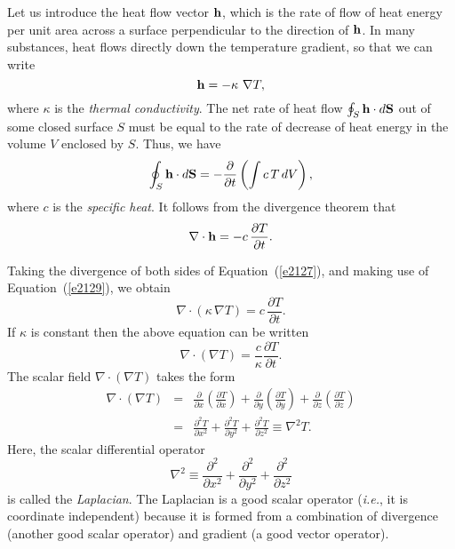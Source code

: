 Let us introduce the heat flow vector ${\bf h}$, which is the rate of flow of heat
energy per unit area across a surface perpendicular to the direction of ${\bf h}$.
In many substances, heat flows directly down the temperature gradient, so that we
can write
\begin{equation}\label{e2127}
{\bf h} = - \kappa \,\,\nabla T,
\end{equation}
where $\kappa$ is the {\em thermal conductivity}. The net rate of heat flow 
$\oint_S {\bf h}\cdot d{\bf S}$ out of some closed surface $S$ must be equal
to the rate of decrease of heat energy in the volume $V$ enclosed by $S$.
Thus, we have
\begin{equation}
\oint_S {\bf h}\cdot d{\bf S} = - \frac{\partial}{\partial t}\left(
\int c\, T\,dV\right),
\end{equation}
where $c$ is the {\em specific heat}. It follows from the divergence theorem that
\begin{equation}\label{e2129}
\nabla\cdot{\bf h} = -c\,\frac{\partial T}{\partial t}.
\end{equation}

Taking the divergence of both sides of Equation~(\ref{e2127}), and making use of Equation~(\ref{e2129}),
 we obtain
\begin{equation}
\nabla\cdot\left(\kappa \,\nabla T\right) = c\,\frac{\partial T}{\partial t}.
\end{equation}
If $\kappa$ is constant then the above equation  can be written
\begin{equation}
\nabla\cdot (\nabla T) = \frac{c}{\kappa} \frac{ \partial T}{\partial t}.
\end{equation}
The scalar field $\nabla\cdot (\nabla T)$ takes the form 
\begin{eqnarray}
\nabla\cdot(\nabla T) &=& 
\frac{\partial}{\partial x}\!\left(\frac{\partial T}{\partial x}\right)+
\frac{\partial}{\partial y}\!\left(\frac{\partial T}{\partial y}\right)+
\frac{\partial}{\partial z}\!\left(\frac{\partial T}{\partial z}\right)
\nonumber\\[0.5ex]
&=& \frac{\partial^2 T}{\partial x^2}+\frac{\partial^2 T}{\partial y^2} +
\frac{\partial^2 T}{\partial z^2} \equiv \nabla^2 T.
\end{eqnarray}
Here, the scalar differential operator
\begin{equation}
\nabla^2 \equiv \frac{\partial^2}{\partial x^2}+ 
\frac{\partial^2}{\partial y^2}+ \frac{\partial^2}{\partial z^2}
\end{equation}
is called the {\em Laplacian}. The Laplacian is a good scalar operator
({\em i.e.}, it is coordinate independent) because it is formed from a
combination of divergence
(another good scalar operator) and gradient (a good vector
operator). 

